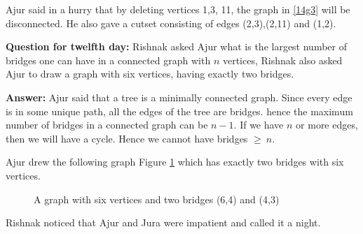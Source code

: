 Ajur said in a hurry that by deleting vertices 1,3, 11, the graph in \ref{14g3} will be disconnected. He
also gave a cutset consisting of edges (2,3),(2,11) and (1,2).

\textbf{Question for twelfth day:} Rishnak asked Ajur what is the largest number of bridges one can have in a connected graph with $n$ vertices, Rishnak also asked Ajur to draw a graph with six vertices, having exactly two bridges.

\textbf{Answer:} Ajur said that a tree is a minimally connected graph. Since every edge is in some unique path, all the edges of the tree are bridges. hence the maximum number of bridges in a connected graph can be $n-1$. If we have $n$ or more edges, then we will have a cycle. Hence we cannot have bridges $\ge~n$.

Ajur drew the following graph Figure \ref{14ag1} which has exactly two bridges with six vertices.

\begin{figure}
\begin{center}
\caption{A graph with six vertices and two bridges (6,4) and (4,3)}\label{14ag1}
\end{center}
\end{figure}


Rishnak noticed that Ajur and Jura were impatient and called it a night.